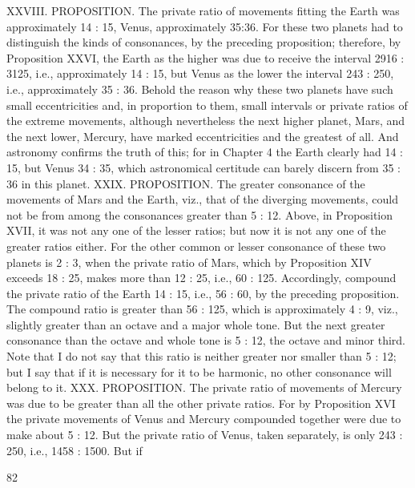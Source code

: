 \documentclass{article}
\begin{document}
XXVIII. PROPOSITION. The private ratio of movements fitting the
Earth was approximately 14 : 15, Venus, approximately 35:36.
For these two planets had to distinguish the kinds of consonances, by the
preceding proposition; therefore, by Proposition XXVI, the Earth as the
higher was due to receive the interval 2916 : 3125, i.e., approximately 14 :
15, but Venus as the lower the interval 243 : 250, i.e., approximately 35 :
36.
Behold the reason why these two planets have such small eccentricities
and, in proportion to them, small intervals or private ratios of the
extreme movements, although nevertheless the next higher planet, Mars,
and the next lower, Mercury, have marked eccentricities and the greatest
of all. And astronomy confirms the truth of this; for in Chapter 4 the
Earth clearly had 14 : 15, but Venus 34 : 35, which astronomical certitude
can barely discern from 35 : 36 in this planet.
XXIX. PROPOSITION. The greater consonance of the movements of
Mars and the Earth, viz., that of the diverging movements, could not be
from among the consonances greater than 5 : 12.
Above, in Proposition XVII, it was not any one of the lesser ratios; but
now it is not any one of the greater ratios either. For the other common
or lesser consonance of these two planets is 2 : 3, when the private ratio
of Mars, which by Proposition XIV exceeds 18 : 25, makes more than 12 :
25, i.e., 60 : 125. Accordingly, compound the private ratio of the Earth 14
: 15, i.e., 56 : 60, by the preceding proposition. The compound ratio is
greater than 56 : 125, which is approximately 4 : 9, viz., slightly greater
than an octave and a major whole tone. But the next greater consonance
than the octave and whole tone is 5 : 12, the octave and minor third.
Note that I do not say that this ratio is neither greater nor smaller than 5
: 12; but I say that if it is necessary for it to be harmonic, no other
consonance will belong to it.
XXX. PROPOSITION. The private ratio of movements of Mercury was
due to be greater than all the other private ratios.
For by Proposition XVI the private movements of Venus and Mercury
compounded together were due to make about 5 : 12. But the private
ratio of Venus, taken separately, is only 243 : 250, i.e., 1458 : 1500. But if


82
\end{document}

